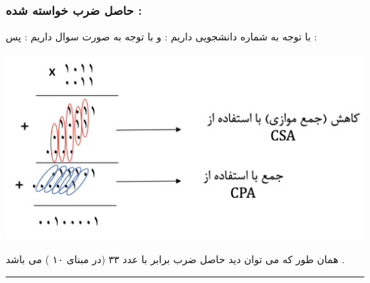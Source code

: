 \documentclass{article}
\begin{document}
\subsubsection*{حاصل ضرب خواسته شده  : }
با توجه به شماره دانشجویی داریم  : 
و با توجه به صورت سوال داریم  : 
\newpage
پس  : 
\begin{center}
	\includegraphics[width=1\textwidth]{wallace}
\end{center}
همان طور که می توان دید حاصل ضرب برابر با عدد ۳۳ (در مبنای ۱۰ ) می باشد . 
\hrule
\end{document}
